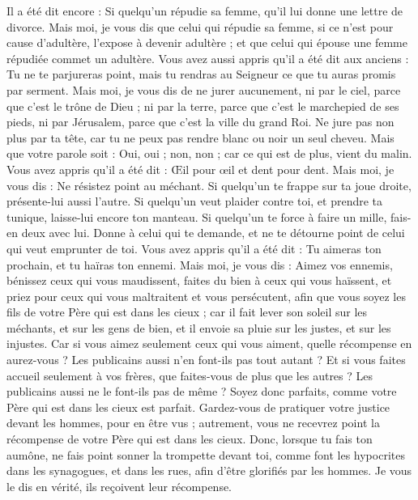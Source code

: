 \begin{multicols}{2}
Il a été dit encore : Si quelqu'un répudie sa femme, qu'il lui donne une lettre de divorce.
Mais moi, je vous dis que celui qui répudie sa femme, si ce n'est pour cause d'adultère, l’expose à devenir adultère ; et que celui qui épouse une femme répudiée commet un adultère.
Vous avez aussi appris qu'il a été dit aux anciens : Tu ne te parjureras point, mais tu rendras au Seigneur ce que tu auras promis par serment.
Mais moi, je vous dis de ne jurer aucunement, ni par le ciel, parce que c'est le trône de Dieu ;
ni par la terre, parce que c'est le marchepied de ses pieds, ni par Jérusalem, parce que c'est la ville du grand Roi.
Ne jure pas non plus par ta tête, car tu ne peux pas rendre blanc ou noir un seul cheveu.
Mais que votre parole soit : Oui, oui ; non, non ; car ce qui est de plus, vient du malin.
Vous avez appris qu'il a été dit : Œil pour œil et dent pour dent.
Mais moi, je vous dis : Ne résistez point au méchant. Si quelqu'un te frappe sur ta joue droite, présente-lui aussi l'autre.
Si quelqu'un veut plaider contre toi, et prendre ta tunique, laisse-lui encore ton manteau.
Si quelqu'un te force à faire un mille, fais-en deux avec lui.
Donne à celui qui te demande, et ne te détourne point de celui qui veut emprunter de toi.
Vous avez appris qu'il a été dit : Tu aimeras ton prochain, et tu haïras ton ennemi.
Mais moi, je vous dis : Aimez vos ennemis, bénissez ceux qui vous maudissent, faites du bien à ceux qui vous haïssent, et priez pour ceux qui vous maltraitent et vous persécutent,
afin que vous soyez les fils de votre Père qui est dans les cieux ; car il fait lever son soleil sur les méchants, et sur les gens de bien, et il envoie sa pluie sur les justes, et sur les injustes.
Car si vous aimez seulement ceux qui vous aiment, quelle récompense en aurez-vous ? Les publicains aussi n'en font-ils pas tout autant ?
Et si vous faites accueil seulement à vos frères, que faites-vous de plus que les autres ? Les publicains aussi ne le font-ils pas de même ?
Soyez donc parfaits, comme votre Père qui est dans les cieux est parfait.
\VerseOne{}Gardez-vous de pratiquer votre justice devant les hommes, pour en être vus ; autrement, vous ne recevrez point la récompense de votre Père qui est dans les cieux.
Donc, lorsque tu fais ton aumône, ne fais point sonner la trompette devant toi, comme font les hypocrites dans les synagogues, et dans les rues, afin d’être glorifiés par les hommes. Je vous le dis en vérité, ils reçoivent leur récompense.

\end{multicols}
